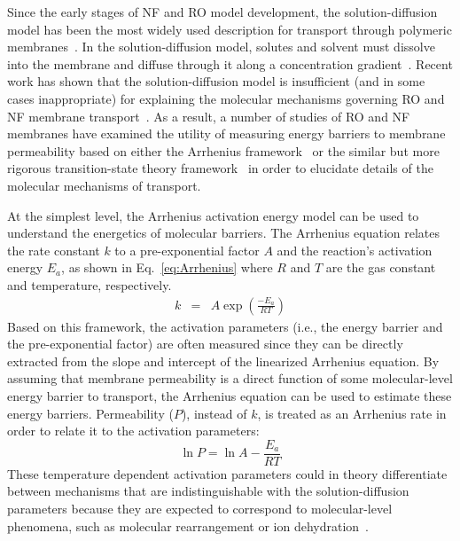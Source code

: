\documentclass[12pt]{article}
\begin{document}
Since the early stages of NF and RO model development, the solution-diffusion model has been the most widely used description for transport through polymeric membranes~\cite{wijmans_solution-diffusion_1995}. In the solution-diffusion model, solutes and solvent must dissolve into the membrane and diffuse through it along a concentration gradient~\cite{wijmans_solution-diffusion_1995}. Recent work has shown that the solution-diffusion model is insufficient (and in some cases inappropriate) for explaining the molecular mechanisms governing RO and NF membrane transport~\cite{heiranian_mechanisms_2023,epsztein_towards_2020,wang_water_2023,biesheuvel_theory_2023}. As a result, a number of studies of RO and NF membranes have examined the utility of measuring energy barriers to membrane permeability based on either the Arrhenius framework~\cite{zhai_roles_2022,lu_dehydration-enhanced_2023,epsztein_elucidating_2018,zhou_intrapore_2020,epsztein_role_2018} or the similar but more rigorous transition-state theory framework~\cite{shefer_applying_2022,white_theoretical_2022,shefer_enthalpic_2021,rickman_temperature-variation_2014,shefer_limited_2022,kingsbury_kinetic_2024} in order to elucidate details of the molecular mechanisms of transport. 

At the simplest level, the Arrhenius activation energy model can be used to understand the energetics of molecular barriers. The Arrhenius equation relates the rate constant $k$ to a pre-exponential factor $A$ and the reaction's activation energy $E_a$, as shown in Eq.~\ref{eq:Arrhenius} where $R$ and $T$ are the gas constant and temperature, respectively.
\begin{eqnarray}
    \label{eq:Arrhenius}
    k &=& A \exp{\left( \frac{-E_a}{R T} \right)} 
\end{eqnarray}
Based on this framework, the activation parameters (i.e., the energy barrier and the pre-exponential factor) are often measured since they can be directly extracted from the slope and intercept of the linearized Arrhenius equation. By assuming that membrane permeability is a direct function of some molecular-level energy barrier to transport, the Arrhenius equation can be used to estimate these energy barriers. Permeability ($P$), instead of $k$, is treated as an Arrhenius rate in order to relate it to the activation parameters:
\begin{equation}
    \ln P = \ln A -\frac{E_a}{R T}
\end{equation}
These temperature dependent activation parameters could in theory differentiate between mechanisms that are indistinguishable with the solution-diffusion parameters because they are expected to correspond to molecular-level phenomena, such as molecular rearrangement or ion dehydration~\cite{shefer_applying_2022}.
\end{document}
